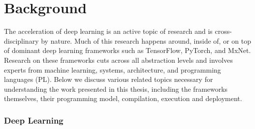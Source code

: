 \chapter{Background}
\label{ch:related}

The acceleration of deep learning is an active topic of research and is
  cross-disciplinary by nature.
Much of this research happens around, inside of, or on top of
  dominant deep learning frameworks
  such as TensorFlow, PyTorch, and MxNet.
Research on these frameworks cuts across all abstraction levels and
  involves experts from
  machine learning,
  systems,
  architecture,
  and programming languages (PL).
Below we discuss various related topics necessary for understanding the work presented
  in this thesis, including the frameworks themselves, their programming model, compilation, execution and deployment.

\subsection{Deep Learning}


